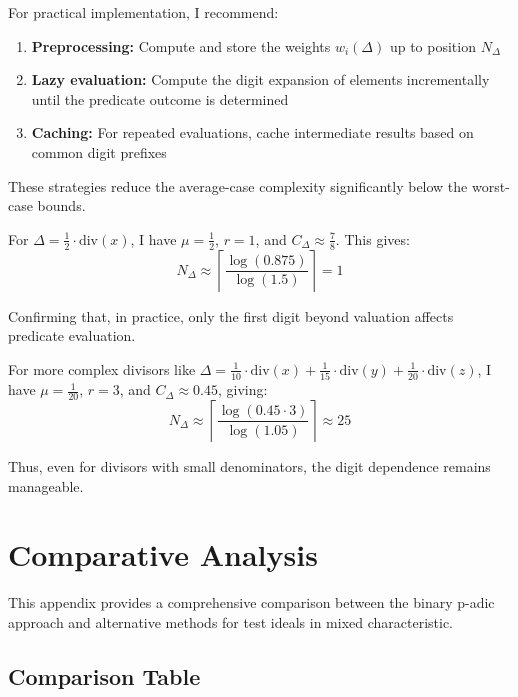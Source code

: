 For practical implementation, I recommend:

\begin{enumerate}
    \item \textbf{Preprocessing:} Compute and store the weights $w_i(\Delta)$ up to position $N_\Delta$
    \item \textbf{Lazy evaluation:} Compute the digit expansion of elements incrementally until the predicate outcome is determined
    \item \textbf{Caching:} For repeated evaluations, cache intermediate results based on common digit prefixes
\end{enumerate}

These strategies reduce the average-case complexity significantly below the worst-case bounds.

\begin{example}
For $\Delta = \frac{1}{2} \cdot \text{div}(x)$, I have $\mu = \frac{1}{2}$, $r = 1$, and $C_\Delta \approx \frac{7}{8}$. This gives:
$$N_\Delta \approx \left\lceil \frac{\log(0.875)}{\log(1.5)} \right\rceil = 1$$

Confirming that, in practice, only the first digit beyond valuation affects predicate evaluation.

For more complex divisors like $\Delta = \frac{1}{10} \cdot \text{div}(x) + \frac{1}{15} \cdot \text{div}(y) + \frac{1}{20} \cdot \text{div}(z)$, I have $\mu = \frac{1}{20}$, $r = 3$, and $C_\Delta \approx 0.45$, giving:
$$N_\Delta \approx \left\lceil \frac{\log(0.45 \cdot 3)}{\log(1.05)} \right\rceil \approx 25$$

Thus, even for divisors with small denominators, the digit dependence remains manageable.
\end{example}

\section{Comparative Analysis}\label{app:comparative-analysis}

This appendix provides a comprehensive comparison between the binary p-adic approach and alternative methods for test ideals in mixed characteristic.

\subsection{Comparison Table}

